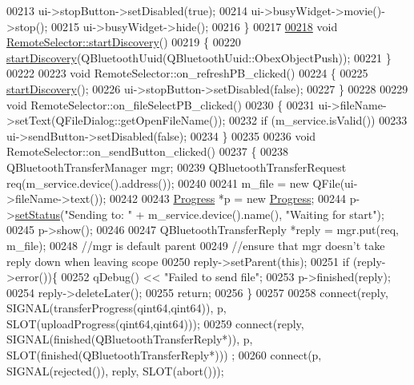 \begin{DoxyCode}
{00213     ui->stopButton->setDisabled(\textcolor{keyword}{true});
00214     ui->busyWidget->movie()->stop();
00215     ui->busyWidget->hide();
00216 \}
00217 
\hypertarget{remoteselector_8cpp_source.tex_l00218}{}\hyperlink{classRemoteSelector_a63cf76514fa5b2bf1b85b87db1a49e99}{00218} \textcolor{keywordtype}{void} \hyperlink{classRemoteSelector_a63cf76514fa5b2bf1b85b87db1a49e99}{RemoteSelector::startDiscovery}()
00219 \{
00220     \hyperlink{classRemoteSelector_a63cf76514fa5b2bf1b85b87db1a49e99}{startDiscovery}(QBluetoothUuid(QBluetoothUuid::ObexObjectPush));
00221 \}
00222 
00223 \textcolor{keywordtype}{void} RemoteSelector::on\_refreshPB\_clicked()
00224 \{
00225     \hyperlink{classRemoteSelector_a63cf76514fa5b2bf1b85b87db1a49e99}{startDiscovery}();
00226     ui->stopButton->setDisabled(\textcolor{keyword}{false});
00227 \}
00228 
00229 \textcolor{keywordtype}{void} RemoteSelector::on\_fileSelectPB\_clicked()
00230 \{
00231     ui->fileName->setText(QFileDialog::getOpenFileName());
00232     \textcolor{keywordflow}{if} (m\_service.isValid())
00233         ui->sendButton->setDisabled(\textcolor{keyword}{false});
00234 \}
00235 
00236 \textcolor{keywordtype}{void} RemoteSelector::on\_sendButton\_clicked()
00237 \{
00238     QBluetoothTransferManager mgr;
00239     QBluetoothTransferRequest req(m\_service.device().address());
00240 
00241     m\_file = \textcolor{keyword}{new} QFile(ui->fileName->text());
00242 
00243     \hyperlink{classProgress}{Progress} *p = \textcolor{keyword}{new} \hyperlink{classProgress}{Progress};
00244     p->\hyperlink{classProgress_ae2fec44e18b6cfb3e4cba984bdb16824}{setStatus}(\textcolor{stringliteral}{"Sending to: "} + m\_service.device().name(), \textcolor{stringliteral}{"Waiting for start"});
00245     p->show();
00246 
00247     QBluetoothTransferReply *reply = mgr.put(req, m\_file);
00248     \textcolor{comment}{//mgr is default parent}
00249     \textcolor{comment}{//ensure that mgr doesn't take reply down when leaving scope}
00250     reply->setParent(\textcolor{keyword}{this});
00251     \textcolor{keywordflow}{if} (reply->error())\{
00252         qDebug() << \textcolor{stringliteral}{"Failed to send file"};
00253         p->finished(reply);
00254         reply->deleteLater();
00255         \textcolor{keywordflow}{return};
00256     \}
00257 
00258     connect(reply, SIGNAL(transferProgress(qint64,qint64)), p, SLOT(uploadProgress(qint64,qint64)));
00259     connect(reply, SIGNAL(finished(QBluetoothTransferReply*)), p, SLOT(finished(QBluetoothTransferReply*)))
      ;
00260     connect(p, SIGNAL(rejected()), reply, SLOT(abort()));
}
\end{DoxyCode}
